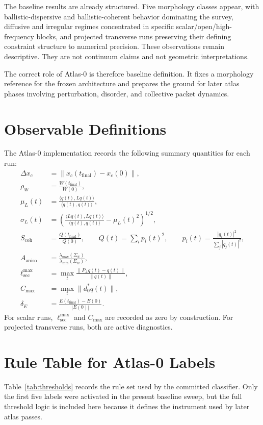 \documentclass[11pt]{article}
\begin{document}
The baseline results are already structured. Five morphology classes appear, with ballistic-dispersive and ballistic-coherent behavior dominating the survey, diffusive and irregular regimes concentrated in specific scalar/open/high-frequency blocks, and projected transverse runs preserving their defining constraint structure to numerical precision. These observations remain descriptive. They are not continuum claims and not geometric interpretations.

The correct role of Atlas-0 is therefore baseline definition. It fixes a morphology reference for the frozen architecture and prepares the ground for later atlas phases involving perturbation, disorder, and collective packet dynamics.

\appendix
\section{Observable Definitions}
The Atlas-0 implementation records the following summary quantities for each run:
\begin{align}
\Delta x_c &= \|x_c(t_{\mathrm{final}})-x_c(0)\|, \\
\rho_W &= \frac{W(t_{\mathrm{final}})}{W(0)}, \\
\mu_L(t) &= \frac{\langle q(t),Lq(t)\rangle}{\langle q(t),q(t)\rangle}, \\
\sigma_L(t) &= \left(
\frac{\langle Lq(t),Lq(t)\rangle}{\langle q(t),q(t)\rangle}
- \mu_L(t)^2
\right)^{1/2}, \\
S_{\mathrm{coh}} &= \frac{Q(t_{\mathrm{final}})}{Q(0)}, \qquad
Q(t)=\sum_i p_i(t)^2, \qquad
p_i(t)=\frac{|q_i(t)|^2}{\sum_j |q_j(t)|^2}, \\
A_{\mathrm{aniso}} &= \frac{\lambda_{\max}(\Sigma_w)}{\lambda_{\min}(\Sigma_w)}, \\
\ell_{\mathrm{sec}}^{\max} &= \max_t \frac{\|P_{\perp}q(t)-q(t)\|}{\|q(t)\|}, \\
C_{\max} &= \max_t \|d_0^{*}q(t)\|, \\
\delta_E &= \frac{E(t_{\mathrm{final}})-E(0)}{|E(0)|}.
\end{align}
For scalar runs, $\ell_{\mathrm{sec}}^{\max}$ and $C_{\max}$ are recorded as zero by construction. For projected transverse runs, both are active diagnostics.

\section{Rule Table for Atlas-0 Labels}
Table~\ref{tab:thresholds} records the rule set used by the committed classifier. Only the first five labels were activated in the present baseline sweep, but the full threshold logic is included here because it defines the instrument used by later atlas passes.
\end{document}
